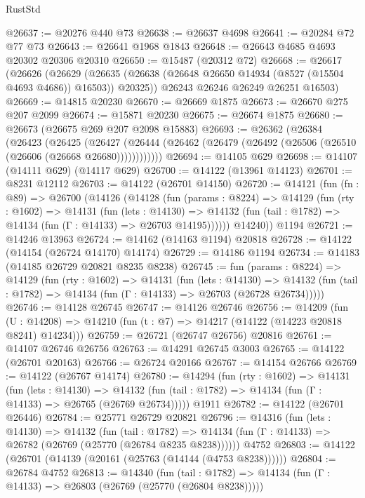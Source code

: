\begin{lexlean}{RustStd}
\begin{coremodule}
@26637 := @20276 @440 @73
@26638 := @26637 @4698
@26641 := @20284 @72 @77 @73
@26643 := @26641 @1968 @1843
@26648 := @26643 @4685 @4693 @20302 @20306 @20310
@26650 := @15487 (@20312 @72)
@26668 := @26617
    (@26626
      (@26629 (@26635 (@26638 (@26648 @26650 @14934 (@8527 (@15504 @4693 @4686)) @16503)) @20325))
      @26243
      @26246
      @26249
      @26251
      @16503)
@26669 := @14815 @20230
@26670 := @26669 @1875
@26673 := @26670 @275 @207 @2099
@26674 := @15871 @20230
@26675 := @26674 @1875
@26680 := @26673 (@26675 @269 @207 @2098 @15883)
@26693 := @26362
    (@26384
      (@26423
        (@26425
          (@26427 (@26444 (@26462 (@26479 (@26492 (@26506 (@26510 (@26606 (@26668 @26680))))))))))))
@26694 := @14105 @629
@26698 := @14107 (@14111 @629) (@14117 @629)
@26700 := @14122 (@13961 @14123)
@26701 := @8231 @12112
@26703 := @14122 (@26701 @14150)
@26720 := @14121
    (fun (fn : @89) =>
    @26700
      (@14126
        (@14128
          (fun (params : @8224) =>
          @14129
            (fun (rty : @1602) =>
            @14131
              (fun (lets : @14130) =>
              @14132 (fun (tail : @1782) => @14134 (fun (Γ : @14133) => @26703 @14195))))))
        @14240))
    @1194
@26721 := @14246 @13963
@26724 := @14162 (@14163 @1194) @20818
@26728 := @14122 (@14154 (@26724 @14170) @14174)
@26729 := @14186 @1194
@26734 := @14183 (@14185 @26729 @20821 @8235 @8238)
@26745 := fun (params : @8224) =>
  @14129
    (fun (rty : @1602) =>
    @14131
      (fun (lets : @14130) =>
      @14132 (fun (tail : @1782) => @14134 (fun (Γ : @14133) => @26703 (@26728 @26734)))))
@26746 := @14128 @26745
@26747 := @14126 @26746
@26756 := @14209
    (fun (U : @14208) => @14210 (fun (t : @7) => @14217 (@14122 (@14223 @20818 @8241) @14234)))
@26759 := @26721 (@26747 @26756) @20816
@26761 := @14107 @26746 @26756
@26763 := @14291 @26745 @3003
@26765 := @14122 (@26701 @20163)
@26766 := @26724 @20166
@26767 := @14154 @26766
@26769 := @14122 (@26767 @14174)
@26780 := @14294
    (fun (rty : @1602) =>
    @14131
      (fun (lets : @14130) =>
      @14132 (fun (tail : @1782) => @14134 (fun (Γ : @14133) => @26765 (@26769 @26734)))))
    @1911
@26782 := @14122 (@26701 @26446)
@26784 := @25771 @26729 @20821
@26796 := @14316
    (fun (lets : @14130) =>
    @14132
      (fun (tail : @1782) =>
      @14134 (fun (Γ : @14133) => @26782 (@26769 (@25770 (@26784 @8235 @8238))))))
    @4752
@26803 := @14122 (@26701 (@14139 (@20161 (@25763 (@14144 (@4753 @8238))))))
@26804 := @26784 @4752
@26813 := @14340
    (fun (tail : @1782) => @14134 (fun (Γ : @14133) => @26803 (@26769 (@25770 (@26804 @8238)))))

\end{coremodule}
\end{lexlean}
